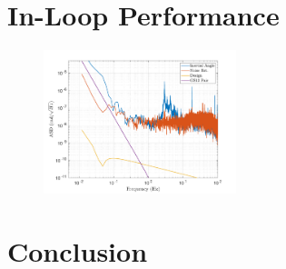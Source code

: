 \documentclass[twocolumn]{revtex4-1}
\begin{document}
\section{In-Loop Performance}

\begin{figure}[!h]
\centering \includegraphics[width=0.5\textwidth]{cBRS_Stanford_InAir_TableLocked.pdf}
\caption{}
\label{inloop} 
\end{figure}

\section{Conclusion}

 

\end{document}
